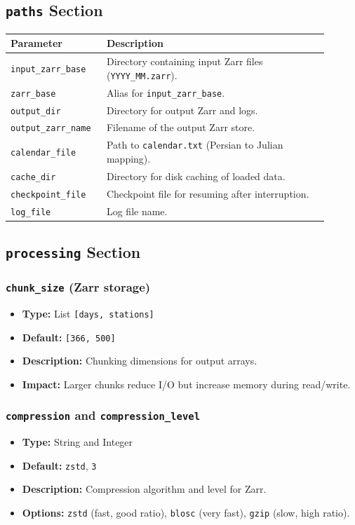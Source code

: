 \documentclass[12pt,a4paper]{article}
\begin{document}
\subsection{\texttt{paths} Section}
\begin{longtable}{p{0.25\linewidth} p{0.65\linewidth}}
    \toprule
    \textbf{Parameter} & \textbf{Description} \\
    \midrule
    \texttt{input\_zarr\_base} & Directory containing input Zarr files (\texttt{YYYY\_MM.zarr}). \\
    \texttt{zarr\_base} & Alias for \texttt{input\_zarr\_base}. \\
    \texttt{output\_dir} & Directory for output Zarr and logs. \\
    \texttt{output\_zarr\_name} & Filename of the output Zarr store. \\
    \texttt{calendar\_file} & Path to \texttt{calendar.txt} (Persian to Julian mapping). \\
    \texttt{cache\_dir} & Directory for disk caching of loaded data. \\
    \texttt{checkpoint\_file} & Checkpoint file for resuming after interruption. \\
    \texttt{log\_file} & Log file name. \\
    \bottomrule
\end{longtable}

\subsection{\texttt{processing} Section}
\subsubsection{\texttt{chunk\_size} (Zarr storage)}
\begin{itemize}[leftmargin=*]
    \item \textbf{Type:} List \texttt{[days, stations]}
    \item \textbf{Default:} \texttt{[366, 500]}
    \item \textbf{Description:} Chunking dimensions for output arrays.
    \item \textbf{Impact:} Larger chunks reduce I/O but increase memory during read/write.
\end{itemize}
\subsubsection{\texttt{compression} and \texttt{compression\_level}}
\begin{itemize}[leftmargin=*]
    \item \textbf{Type:} String and Integer
    \item \textbf{Default:} \texttt{zstd}, \texttt{3}
    \item \textbf{Description:} Compression algorithm and level for Zarr.
    \item \textbf{Options:} \texttt{zstd} (fast, good ratio), \texttt{blosc} (very fast), \texttt{gzip} (slow, high ratio).
\end{itemize}
\end{document}
